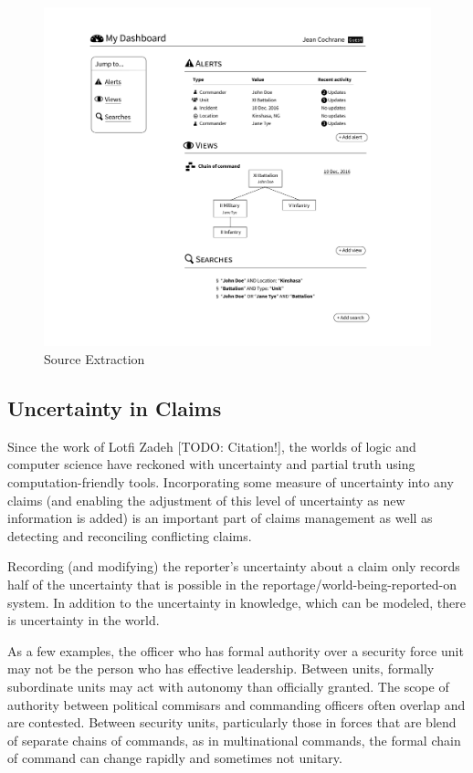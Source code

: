 \documentclass[format=siggraph, review=true]{acmart}
\begin{document}
\begin{figure}[h]
\includegraphics[width=\columnwidth]{images/sketches/dashboard.png}
\caption{Source Extraction}
\label{fig:dashboard}
\end{figure}



\subsection{Uncertainty in Claims}
Since the work of Lotfi Zadeh [TODO: Citation!], the worlds of logic
and computer science have reckoned with uncertainty and partial truth
using computation-friendly tools. Incorporating some measure of
uncertainty into any claims (and enabling the adjustment of this level
of uncertainty as new information is added) is an important part of
claims management as well as detecting and reconciling conflicting
claims.


Recording (and modifying) the reporter's uncertainty about a claim
only records half of the uncertainty that is possible in the
reportage/world-being-reported-on system. In addition to the
uncertainty in knowledge, which can be modeled, there is uncertainty
in the world.

As a few examples, the officer who has formal authority over a
security force unit may not be the person who has effective
leadership. Between units, formally subordinate units may act with
autonomy than officially granted. The scope of authority between
political commisars and commanding officers often overlap and are
contested. Between security units, particularly those in forces that
are blend of separate chains of commands, as in multinational
commands, the formal chain of command can change rapidly and sometimes
not unitary.
\end{document}
